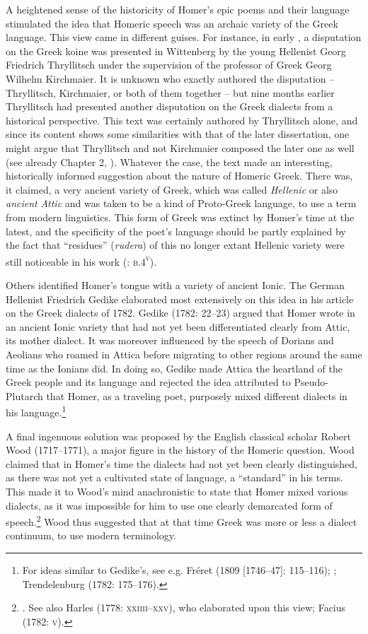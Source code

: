 \documentclass[output=paper]{langsci/langscibook}
\begin{document}
A heightened sense of the historicity of Homer’s epic poems and their language stimulated the idea that Homeric speech was an archaic variety of the Greek language. This view came in different guises. For instance, in early \citealt{November1709}, a disputation on the Greek koine was presented in Wittenberg by the young Hellenist Georg Friedrich Thryllitsch under the supervision of the professor of Greek Georg Wilhelm Kirchmaier. It is unknown who exactly authored the disputation – Thryllitsch, Kirchmaier, or both of them together – but nine months earlier Thryllitsch had presented another disputation on the Greek dialects from a historical perspective. This text was certainly authored by Thryllitsch alone, and since its content shows some similarities with that of the later dissertation, one might argue that Thryllitsch and not Kirchmaier composed the later one as well (see already Chapter 2, ). Whatever the case, the text made an interesting, historically informed suggestion about the nature of Homeric Greek. There was, it claimed, a very ancient variety of Greek, which was called \textit{Hellenic} or also \textit{ancient} \textit{Attic} and was taken to be a kind of Proto-Greek language, to use a term from modern linguistics. This form of Greek was extinct by Homer’s time at the latest, and the specificity of the poet’s language should be partly explained by the fact that “residues” (\textit{rudera}) of this no longer extant Hellenic variety were still noticeable in his work (\citealt{KirchmaierThryllitsch1709}: \textsc{b.4}\textsc{\textsuperscript{v}}).

Others identified Homer’s tongue with a variety of ancient Ionic. The German Hellenist Friedrich Gedike elaborated most extensively on this idea in his article on the Greek dialects of 1782. Gedike (1782: 22–23) argued that Homer wrote in an ancient Ionic variety that had not yet been differentiated clearly from Attic, its mother dialect. It was moreover influenced by the speech of Dorians and Aeolians who roamed in Attica before migrating to other regions around the same time as the Ionians did. In doing so, Gedike made Attica the heartland of the Greek people and its language and rejected the idea attributed to Pseudo-Plutarch that Homer, as a traveling poet, purposely mixed different dialects in his language.\footnote{For ideas similar to Gedike’s, see e.g. Fréret (1809 [1746–47]: 115–116); \citet[202]{Beattie1778}; Trendelenburg (1782: 175–176).}

A final ingenuous solution was proposed by the English classical scholar Robert Wood (1717–1771), a major figure in the history of the Homeric question. Wood claimed that in Homer’s time the dialects had not yet been clearly distinguished, as there was not yet a cultivated state of language, a “standard” in his terms. This made it to Wood’s mind anachronistic to state that Homer mixed various dialects, as it was impossible for him to use one clearly demarcated form of speech.\footnote{\citet[238]{Wood1775}. See also Harles (1778: \textsc{xxiiii–xxv)}, who elaborated upon this view; Facius (1782: \textsc{v}).} Wood thus suggested that at that time Greek was more or less a dialect continuum, to use modern terminology.
\end{document}
